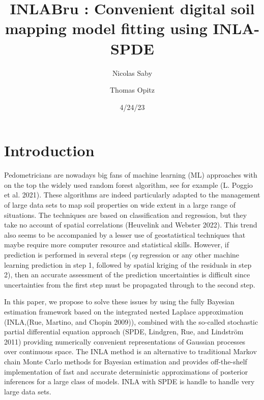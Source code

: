 \documentclass[
  a4paper,
]{article}
\title{INLABru : Convenient digital soil mapping model fitting using
INLA-SPDE}
\author{Nicolas Saby \and Thomas Opitz}
\date{4/24/23}
\renewcommand*\contentsname{Table of contents}
\newcommand\contentsname{Table of contents}
\begin{document}
\maketitle
\ifdefined\Shaded\renewenvironment{Shaded}{\begin{tcolorbox}[breakable, frame hidden, interior hidden, borderline west={3pt}{0pt}{shadecolor}, sharp corners, enhanced, boxrule=0pt]}{\end{tcolorbox}}\fi

\renewcommand*\contentsname{Table of contents}
{
\hypersetup{linkcolor=}
\setcounter{tocdepth}{3}
\tableofcontents
}
\hypertarget{introduction}{%
\section{Introduction}\label{introduction}}

Pedometricians are nowadays big fans of machine learning (ML) approaches
with on the top the widely used random forest algorithm, see for example
(L. Poggio et al. 2021). These algorithms are indeed particularly
adapted to the management of large data sets to map soil properties on
wide extent in a large range of situations. The techniques are based on
classification and regression, but they take no account of spatial
correlations (Heuvelink and Webster 2022). This trend also seems to be
accompanied by a lesser use of geostatistical techniques that maybe
require more computer resource and statistical skills. However, if
prediction is performed in several steps (\emph{eg} regression or any
other machine learning prediction in step 1, followed by spatial kriging
of the residuals in step 2), then an accurate assessment of the
prediction uncertainties is difficult since uncertainties from the first
step must be propagated through to the second step.

In this paper, we propose to solve these issues by using the fully
Bayesian estimation framework based on the integrated nested Laplace
approximation (INLA,(Rue, Martino, and Chopin 2009)), combined with the
so-called stochastic partial differential equation approach (SPDE,
Lindgren, Rue, and Lindström 2011) providing numerically convenient
representations of Gaussian processes over continuous space. The INLA
method is an alternative to traditional Markov chain Monte Carlo methods
for Bayesian estimation and provides off-the-shelf implementation of
fast and accurate deterministic approximations of posterior inferences
for a large class of models. INLA with SPDE is handle to handle very
large data sets.
\end{document}
